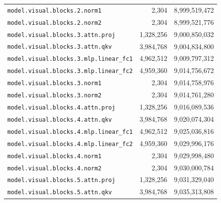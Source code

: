\documentclass[10pt,a4paper]{article}
\theoremstyle{definition}
\begin{document}
\begin{appendices}
\begin{longtable}{p{9.5cm}rr}
\texttt{model.\allowbreak{}visual.\allowbreak{}blocks.\allowbreak{}2.\allowbreak{}norm1} & 2,304 & 8,999,519,472 \\
\texttt{model.\allowbreak{}visual.\allowbreak{}blocks.\allowbreak{}2.\allowbreak{}norm2} & 2,304 & 8,999,521,776 \\
\texttt{model.\allowbreak{}visual.\allowbreak{}blocks.\allowbreak{}3.\allowbreak{}attn.\allowbreak{}proj} & 1,328,256 & 9,000,850,032 \\
\texttt{model.\allowbreak{}visual.\allowbreak{}blocks.\allowbreak{}3.\allowbreak{}attn.\allowbreak{}qkv} & 3,984,768 & 9,004,834,800 \\
\texttt{model.\allowbreak{}visual.\allowbreak{}blocks.\allowbreak{}3.\allowbreak{}mlp.\allowbreak{}linear\_fc1} & 4,962,512 & 9,009,797,312 \\
\texttt{model.\allowbreak{}visual.\allowbreak{}blocks.\allowbreak{}3.\allowbreak{}mlp.\allowbreak{}linear\_fc2} & 4,959,360 & 9,014,756,672 \\
\texttt{model.\allowbreak{}visual.\allowbreak{}blocks.\allowbreak{}3.\allowbreak{}norm1} & 2,304 & 9,014,758,976 \\
\texttt{model.\allowbreak{}visual.\allowbreak{}blocks.\allowbreak{}3.\allowbreak{}norm2} & 2,304 & 9,014,761,280 \\
\texttt{model.\allowbreak{}visual.\allowbreak{}blocks.\allowbreak{}4.\allowbreak{}attn.\allowbreak{}proj} & 1,328,256 & 9,016,089,536 \\
\texttt{model.\allowbreak{}visual.\allowbreak{}blocks.\allowbreak{}4.\allowbreak{}attn.\allowbreak{}qkv} & 3,984,768 & 9,020,074,304 \\
\texttt{model.\allowbreak{}visual.\allowbreak{}blocks.\allowbreak{}4.\allowbreak{}mlp.\allowbreak{}linear\_fc1} & 4,962,512 & 9,025,036,816 \\
\texttt{model.\allowbreak{}visual.\allowbreak{}blocks.\allowbreak{}4.\allowbreak{}mlp.\allowbreak{}linear\_fc2} & 4,959,360 & 9,029,996,176 \\
\texttt{model.\allowbreak{}visual.\allowbreak{}blocks.\allowbreak{}4.\allowbreak{}norm1} & 2,304 & 9,029,998,480 \\
\texttt{model.\allowbreak{}visual.\allowbreak{}blocks.\allowbreak{}4.\allowbreak{}norm2} & 2,304 & 9,030,000,784 \\
\texttt{model.\allowbreak{}visual.\allowbreak{}blocks.\allowbreak{}5.\allowbreak{}attn.\allowbreak{}proj} & 1,328,256 & 9,031,329,040 \\
\texttt{model.\allowbreak{}visual.\allowbreak{}blocks.\allowbreak{}5.\allowbreak{}attn.\allowbreak{}qkv} & 3,984,768 & 9,035,313,808 \\

\end{longtable}
\end{appendices}
\end{document}
